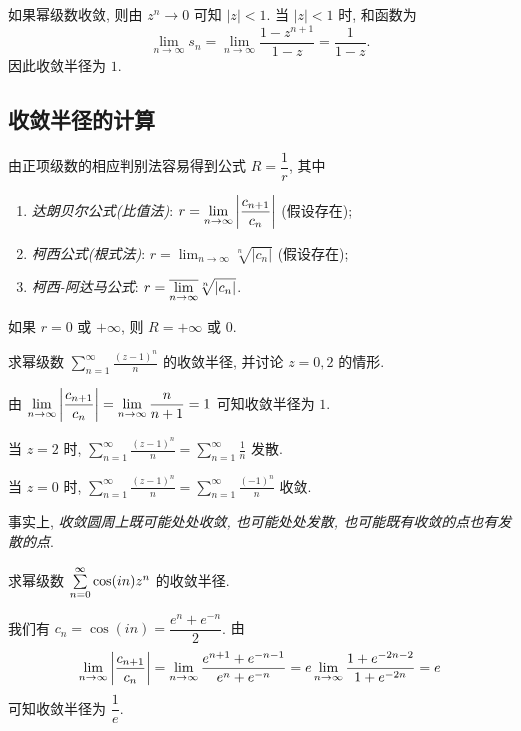 \begin{solution}
	如果幂级数收敛, 则由 $z^n\to0$ 可知 $|z|<1$.
	{当 $|z|<1$ 时, 和函数为
		\[\lim_{n\to\infty}s_n=\lim_{n\to\infty}\frac{1-z^{n+1}}{1-z}=\frac1{1-z}.\]因此收敛半径为 $1$.}
\end{solution}

\subsection{收敛半径的计算}

由正项级数的相应判别法容易得到公式 $R=\dfrac1r$, 其中
\begin{enumerate}
	\item \emph{达朗贝尔公式(比值法)}: $r=\displaystyle\lim_{n\to\infty}\left|\frac{c_{n+1}}{c_n}\right|$ (假设存在);
	\item \emph{柯西公式(根式法)}: $r=\displaystyle\lim_{n\to\infty}\sqrt[n]{|c_n|}$ (假设存在);
	\item \emph{柯西-阿达马公式}: $r=\displaystyle\overline{\lim_{n\to\infty}} \sqrt[n]{|c_n|}$.
\end{enumerate}
如果 $r=0$ 或 $+\infty$, 则 $R=+\infty$ 或 $0$.

\begin{example}
	求幂级数 $\displaystyle\sum_{n=1}^\infty\frac{(z-1)^n}n$ 的收敛半径, 并讨论 $z=0,2$ 的情形.
\end{example}

\begin{solution}
	由 $\displaystyle\lim_{n\to\infty}\left|\frac{c_{n+1}}{c_n}\right|=\lim_{n\to\infty}\frac n{n+1}=1$ 可知收敛半径为 $1$.

	{当 $z=2$ 时, $\displaystyle\sum_{n=1}^\infty\frac{(z-1)^n}n=\sum_{n=1}^\infty\frac1n$ 发散.}

	{当 $z=0$ 时, $\displaystyle\sum_{n=1}^\infty\frac{(z-1)^n}n=\sum_{n=1}^\infty\frac{(-1)^n}n$ 收敛.}
\end{solution}

事实上, \emph{收敛圆周上既可能处处收敛, 也可能处处发散, 也可能既有收敛的点也有发散的点}.

\begin{example}
	求幂级数 $\sum\limits_{n=0}^\infty\cos(in)z^n$ 的收敛半径.
\end{example}

\begin{solution}
	我们有 $c_n=\cos(in)=\dfrac{e^n+e^{-n}}2$.
	{由
		\[\lim_{n\to\infty}\left|\frac{c_{n+1}}{c_n}\right|=\lim_{n\to\infty}\frac{e^{n+1}+e^{-n-1}}{e^n+e^{-n}}=e\lim_{n\to\infty}\frac{1+e^{-2n-2}}{1+e^{-2n}}=e\]
	可知收敛半径为 $\dfrac1e$.}
\end{solution}

